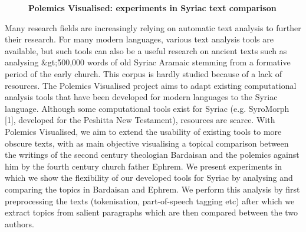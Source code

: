\documentclass[10pt, a4paper, twopage, headinclude, footinclude, BCOR5mm]{book}
\begin{document}
\newpage

\begin{figure}[t!]
\centering
\large\textbf{Polemics Visualised: experiments in Syriac text comparison }
\vspace*{0.5cm}
\end{figure}


\begin{table}[t!]
\end{table} 
\begin{table}[t!]
\end{table} 
\noindent
Many research fields are increasingly relying on automatic text analysis to further their research. For many modern languages, various text analysis tools are available, but such tools can also be a useful research on ancient texts such as analysing \&gt;500,000 words of old Syriac Aramaic stemming from a formative period of the early church. This corpus is hardly studied because of a lack of resources.   The Polemics Visualised project aims to adapt existing computational analysis tools that have been developed for modern languages to the Syriac language. Although some computational tools exist for Syriac (e.g. SyroMorph [1], developed for the Peshitta New Testament), resources are scarce. With Polemics Visualised, we aim to extend the usability of existing tools to more obscure texts, with as main objective visualising a topical comparison between the writings of the second century theologian Bardaisan and the polemics against him by the fourth century church father Ephrem.  We present experiments in which we show the flexibility of our developed tools for Syriac by analysing and comparing the topics in Bardaisan and Ephrem. We perform this analysis by first preprocessing the texts (tokenisation, part-of-speech tagging etc) after which we extract topics from salient paragraphs which are then compared between the two authors.    
\end{document}
